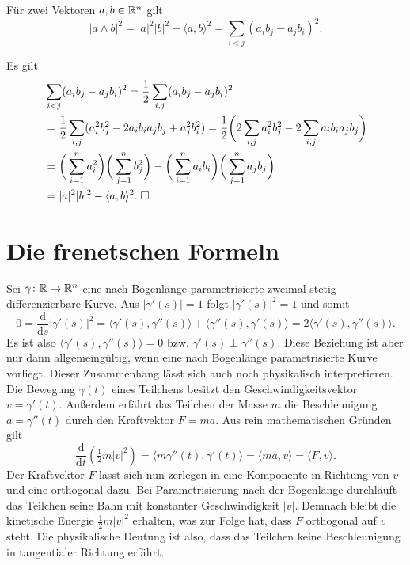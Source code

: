 \begin{theorem}
Für zwei Vektoren $a,b\in\mathbb R^n$ gilt
\begin{equation}
|a\wedge b|^2 = |a|^2 |b|^2 - \langle a,b\rangle^2
= \sum_{i<j} (a_i b_j - a_j b_i)^2.
\end{equation}
\end{theorem}
Es gilt
\begin{align}
&\sum_{i<j} (a_i b_j - a_j b_i)^2
= \frac{1}{2}\sum_{i,j} (a_i b_j - a_j b_i)^2\\
&= \frac{1}{2}\sum_{i,j} (a_i^2 b_j^2 - 2a_i b_i a_j b_j + a_j^2 b_i^2)
= \frac{1}{2}\bigg(2\sum_{i,j} a_i^2 b_j^2 - 2\sum_{i,j}a_i b_i a_j b_j\bigg)\\
&= \bigg(\sum_{i=1}^n a_i^2\bigg)\bigg(\sum_{j=1}^n b_j^2\bigg)
- \bigg(\sum_{i=1}^n a_i b_i\bigg)\bigg(\sum_{j=1}^n a_j b_j\bigg)\\
&= |a|^2 |b|^2 - \langle a,b\rangle^2.\;\Box
\end{align}

\section{Die frenetschen Formeln}

Sei $\gamma\colon\mathbb R\to\mathbb R^n$ eine nach Bogenlänge parametrisierte
zweimal stetig differenzierbare Kurve. Aus $|\gamma'(s)|=1$ folgt
$|\gamma'(s)|^2=1$ und somit%
\begin{equation}\label{eq:orthogonale-Ableitungen}
0 = \frac{\mathrm d}{\mathrm ds} |\gamma'(s)|^2
= \langle \gamma'(s),\gamma''(s)\rangle + \langle\gamma''(s),\gamma'(s)\rangle
= 2\langle\gamma'(s),\gamma''(s)\rangle.
\end{equation}
Es ist also $\langle\gamma'(s),\gamma''(s)\rangle=0$
bzw. $\gamma'(s)\perp\gamma''(s)$. Diese Beziehung ist aber nur dann
allgemeingültig, wenn eine nach Bogenlänge parametrisierte Kurve
vorliegt. Dieser Zusammenhang lässt sich auch noch physikalisch
interpretieren. Die Bewegung $\gamma(t)$ eines Teilchens besitzt den
Geschwindigkeitsvektor $v=\gamma'(t)$. Außerdem erfährt das Teilchen
der Masse $m$ die Beschleunigung $a=\gamma''(t)$ durch den
Kraftvektor $F=ma$. Aus rein mathematischen Gründen gilt%
\begin{equation}
\frac{\mathrm d}{\mathrm dt}(\tfrac{1}{2}m |v|^2)
= \langle m\gamma''(t),\gamma'(t)\rangle = \langle ma,v\rangle
= \langle F,v\rangle.
\end{equation}
Der Kraftvektor $F$ lässt sich nun zerlegen in eine Komponente in
Richtung von $v$ und eine orthogonal dazu. Bei Parametrisierung
nach der Bogenlänge durchläuft das Teilchen seine Bahn mit konstanter
Geschwindigkeit $|v|$. Demnach bleibt die kinetische Energie
$\tfrac{1}{2}m|v|^2$ erhalten,
was zur Folge hat, dass $F$ orthogonal auf $v$ steht. Die physikalische
Deutung ist also, dass das Teilchen keine Beschleunigung in
tangentialer Richtung erfährt.

